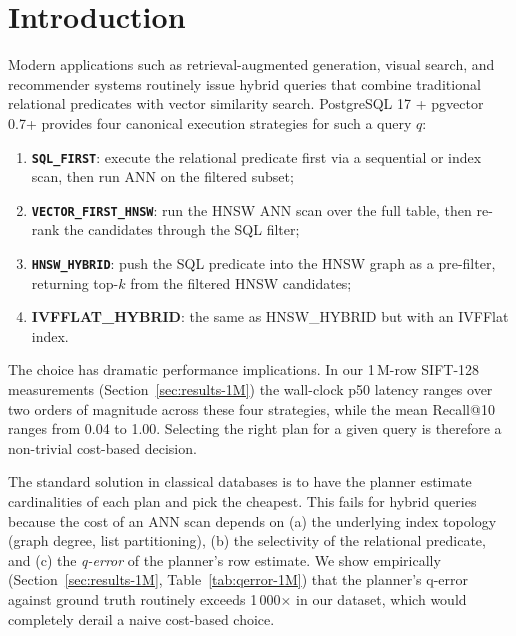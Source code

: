 \documentclass[conference]{IEEEtran}
\begin{document}
\section{Introduction}
\label{sec:intro}
Modern applications such as retrieval-augmented generation, visual
search, and recommender systems routinely issue hybrid queries that
combine traditional relational predicates with vector similarity
search.  PostgreSQL 17 + pgvector 0.7+ provides four canonical
execution strategies for such a query $q$:
\begin{enumerate}
\item \textbf{\texttt{SQL\_FIRST}}: execute the relational predicate
      first via a sequential or index scan, then run ANN on the
      filtered subset;
\item \textbf{\texttt{VECTOR\_FIRST\_HNSW}}: run the HNSW ANN scan
      over the full table, then re-rank the candidates through the
      SQL filter;
\item \textbf{\texttt{HNSW\_HYBRID}}: push the SQL predicate into the
      HNSW graph as a pre-filter, returning top-$k$ from the filtered
      HNSW candidates;
\item \textbf{IVFFLAT\_HYBRID}: the same as HNSW\_HYBRID but
      with an IVFFlat index.
\end{enumerate}
The choice has dramatic performance implications.  In our 1\,M-row
SIFT-128 measurements (Section~\ref{sec:results-1M}) the wall-clock
p50 latency ranges over two orders of magnitude across these four
strategies, while the mean Recall@10 ranges from 0.04 to 1.00.
Selecting the right plan for a given query is therefore a
non-trivial cost-based decision.

The standard solution in classical databases is to have the planner
estimate cardinalities of each plan and pick the cheapest.  This
fails for hybrid queries because the cost of an ANN scan depends on
(a) the underlying index topology (graph degree, list partitioning),
(b) the selectivity of the relational predicate, and (c) the
\emph{q-error} of the planner's row estimate.  We show empirically
(Section~\ref{sec:results-1M}, Table~\ref{tab:qerror-1M}) that the
planner's q-error against ground truth routinely exceeds
1\,000$\times$ in our dataset, which would completely derail a
naive cost-based choice.
\end{document}
